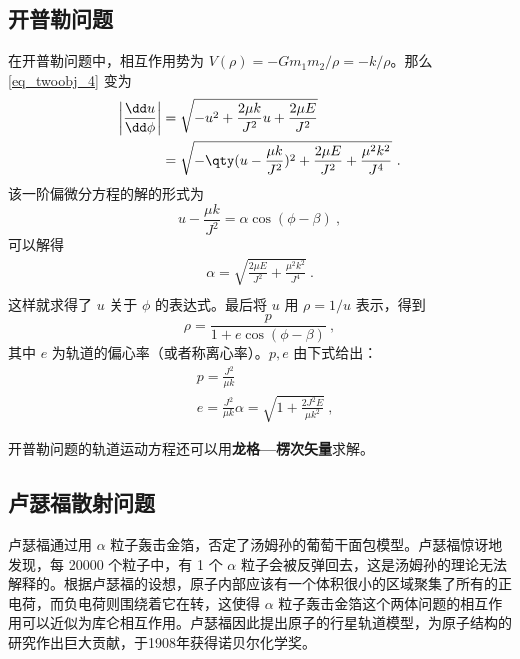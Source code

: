 \subsection{开普勒问题}
在开普勒问题中，相互作用势为 $V(\rho)=-Gm_1m_2/\rho=-k/\rho$。那么 \autoref{eq_twoobj_4} 变为
\begin{equation}
\begin{aligned}
\left|\frac{\dd u}{\dd \phi}\right|&=\sqrt{-u^2+\frac{2\mu k}{J^2}u+\frac{2\mu E}{J^2}}\\
&=\sqrt{-\qty(u-\frac{\mu k}{J^2})^2+\frac{2\mu E}{J^2}+\frac{\mu^2 k^2}{J^4}}~.
\end{aligned}
\end{equation}
该一阶偏微分方程的解的形式为
\begin{equation}
u-\frac{\mu k}{J^2}=\alpha\cos(\phi-\beta)~,
\end{equation}
可以解得
\begin{equation}
\begin{aligned}
\alpha=\sqrt{\frac{2\mu E}{J^2}+\frac{\mu^2 k^2}{J^4}}~.\\
\end{aligned}
\end{equation}
这样就求得了 $u$ 关于 $\phi$ 的表达式。最后将 $u$ 用 $\rho=1/u$ 表示，得到
\begin{equation}
\rho=\frac{p}{1+e\cos(\phi-\beta)}~,
\end{equation}
其中 $e$ 为轨道的偏心率（或者称离心率）。$p,e$ 由下式给出：
\begin{equation}
\begin{aligned}
&p=\frac{J^2}{\mu k}\\
&e=\frac{J^2}{\mu k}\alpha=\sqrt{1+\frac{2J^2E}{\mu k^2}}~,
\end{aligned}
\end{equation}

开普勒问题的轨道运动方程还可以用\textbf{龙格—楞次矢量}求解。

\subsection{卢瑟福散射问题}
卢瑟福通过用 $\alpha$ 粒子轰击金箔，否定了汤姆孙的葡萄干面包模型。卢瑟福惊讶地发现，每 20000 个粒子中，有 1 个 $\alpha$ 粒子会被反弹回去，这是汤姆孙的理论无法解释的。根据卢瑟福的设想，原子内部应该有一个体积很小的区域聚集了所有的正电荷，而负电荷则围绕着它在转，这使得 $\alpha$ 粒子轰击金箔这个两体问题的相互作用可以近似为库仑相互作用。卢瑟福因此提出原子的行星轨道模型，为原子结构的研究作出巨大贡献，于1908年获得诺贝尔化学奖。

